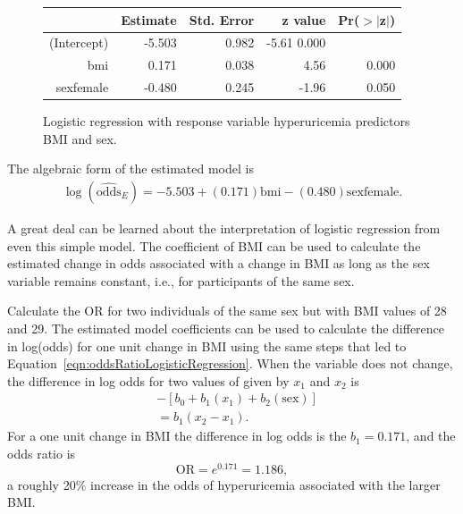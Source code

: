 \begin{figure}[ht]
\centering
\begin{tabular}{rrrrr}
  \hline
 & Estimate & Std. Error & z value & Pr($>$$|$z$|$) \\
  \hline
(Intercept) & -5.503 & 0.982 & -5.61 0.000 \\
  bmi & 0.171 & 0.038 & 4.56 & 0.000 \\
  sexfemale & -0.480 & 0.245 & -1.96 & 0.050 \\
   \hline
\end{tabular}
\caption{Logistic regression with response variable hyperuricemia
        predictors BMI and sex.}
\label{figure:huBmiSexLogReg}
\end{figure}

The algebraic form of the estimated model is
\begin{align}
  \log(\widehat{\text{odds}}_E) = -5.503 + (0.171)\text{bmi}
      -(0.480)\text{sexfemale}.
      \label{eqn:huBmiSexLogReg}
\end{align}

A great deal can be learned about the interpretation of logistic regression from even this simple model.  The coefficient of BMI can be used to calculate the estimated change in odds associated with a change in BMI as long as the sex variable remains constant, i.e., for participants of the same sex.


\begin{examplewrap} 
\begin{nexample}{Calculate the OR for two individuals of the same sex but with BMI values of 28 and 29.}
  The estimated model coefficients can be used to calculate the difference in log(odds) for one unit change in BMI using the same steps that led to Equation~\ref{eqn:oddsRatioLogisticRegression}.  When the variable  does not change, the difference in log odds for two values of  given by $x_1$ and $x_2$ is  
\begin{align}
  [b_0 + b_1(x_2) + b_2(\text{sex})] &- [b_0 + b_1(x_1) + b_2(\text{sex})] \\
      & = b_1(x_2 - x_1).
      \label{eqn:ORChangeTwoVar}
\end{align}
For a one unit change in BMI the difference in log odds is the $b_1 = 0.171$, and the odds ratio is
\[
  \text{OR} = e^{0.171} = 1.186,
\]
a roughly 20\% increase in the odds of hyperuricemia associated with the larger BMI.

\label{example:huBMISexOR}
\end{nexample}
\end{examplewrap}

